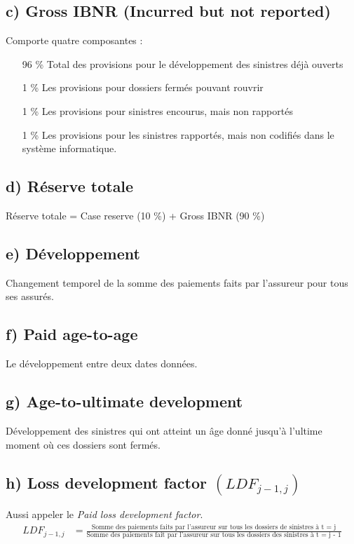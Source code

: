 \documentclass[11pt,french]{report}
\begin{document}
\subsection*{c) Gross IBNR (Incurred but not reported)}

Comporte quatre composantes :
\begin{itemize}
\item[96 \%] Total des provisions pour le développement des sinistres déjà ouverts
\item[1 \%] Les provisions pour dossiers fermés pouvant rouvrir
\item[1 \%] Les provisions pour sinistres encourus, mais non rapportés
\item[1 \%] Les provisions pour les sinistres rapportés, mais non codifiés dans le système informatique.
\end{itemize}

\subsection*{d) Réserve totale}

Réserve totale = Case reserve (10 \%) + Gross IBNR (90 \%)

\subsection*{e) Développement}

Changement temporel de la somme des paiements faits par l'assureur pour tous ses assurés.

\subsection*{f) Paid age-to-age}

Le développement entre deux dates données.

\subsection*{g) Age-to-ultimate development}
Développement des sinistres qui ont atteint un âge donné jusqu'à l'ultime moment où ces dossiers sont fermés.

\subsection*{h) Loss development factor $(LDF_{j-1, j})$}
Aussi appeler le \emph{Paid loss development factor}.
\begin{align*}
LDF_{j-1, j} & = \frac{\text{Somme des paiements faits par l'assureur sur tous les dossiers de sinistres à t = j}}{\text{Somme des paiements fait par l'assureur sur tous les dossiers des sinistres à t = j - 1}}
\end{align*}
\end{document}

